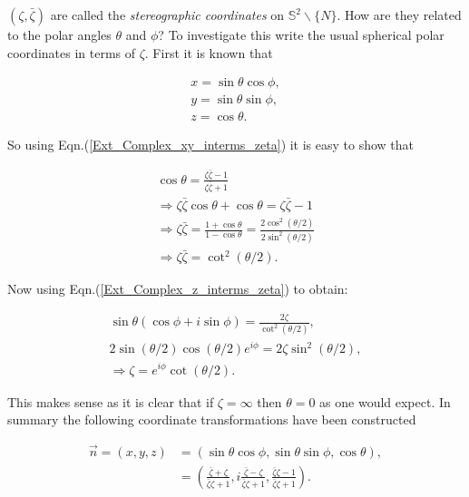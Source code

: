 $(\zeta, \bar{\zeta})$ are called the \textit{stereographic coordinates} on $\mathbb{S}^2 \backslash \{N\}$. How are they related to the polar angles $\theta$ and $\phi$? To investigate this write the usual spherical polar coordinates in terms of $\zeta$. First it is known that

\begin{eqnarray*}
x = \sin{\theta}\cos{\phi}, \\
y = \sin{\theta}\sin{\phi}, \\
z = \cos{\theta}.
\end{eqnarray*}

\noindent So using Eqn.(\ref{Ext_Complex_xy_interms_zeta}) it is easy to show that

\begin{eqnarray*}
\cos{\theta} = \frac{\zeta\bar{\zeta} - 1}{\zeta\bar{\zeta} + 1} \\
\Rightarrow \zeta\bar{\zeta}\cos{\theta} + \cos{\theta} = \zeta\bar{\zeta} - 1\\
\Rightarrow \zeta\bar{\zeta} = \frac{1 + \cos{\theta}}{1 - \cos{\theta}} = \frac{2\cos^2{\left(\theta/2\right)}}{2\sin^2{\left(\theta/2\right)}} \\
\Rightarrow \zeta\bar{\zeta} = \cot^2{\left(\theta/2\right)}.
\end{eqnarray*}

\noindent Now using Eqn.(\ref{Ext_Complex_z_interms_zeta}) to obtain:

\begin{eqnarray*}
\sin{\theta}(\cos{\phi} +i \sin{\phi}) = \frac{2\zeta}{\cot^2{\left(\theta/2\right)}}, \\
2\sin{\left(\theta/2\right)}\cos{\left(\theta/2\right)}e^{i\phi} = 2\zeta \sin^2{\left(\theta/2\right)}, \\
\Rightarrow \zeta = e^{i\phi}\cot{\left(\theta/2\right)}. 
\end{eqnarray*}

\noindent This makes sense as it is clear that if $\zeta = \infty$ then $\theta = 0$ as one would expect. In summary the following coordinate transformations have been constructed

\begin{eqnarray}
\vec{n} = (x, y, z) & = (\sin{\theta}\cos{\phi}, \sin{\theta}\sin{\phi}, \cos{\theta}), \\ \label{Ext_Complex_Vec_n}
                    & = \left( \frac{\bar{\zeta} + \zeta}{\bar{\zeta}\zeta + 1}  ,i\frac{\bar{\zeta} - \zeta}{\bar{\zeta}\zeta + 1}, \frac{\bar{\zeta}\zeta - 1}{\bar{\zeta}\zeta + 1}  \right).
\end{eqnarray}

